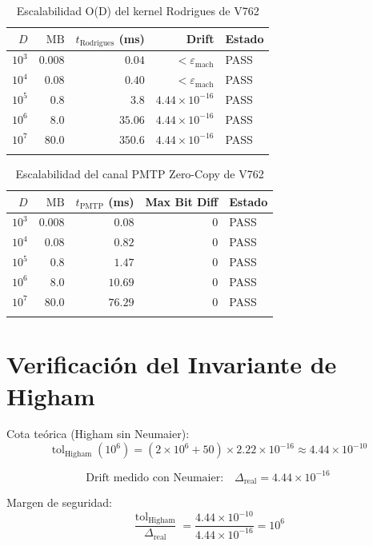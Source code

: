 \begin{longtable}{rrrrl}
\toprule
$D$ & $\text{MB}$ & $t_{\text{Rodrigues}}$ (ms) & Drift & Estado \\
\midrule
$10^3$ & $0.008$ & $0.04$ & $< \varepsilon_{\text{mach}}$ & PASS \\
$10^4$ & $0.08$ & $0.40$ & $< \varepsilon_{\text{mach}}$ & PASS \\
$10^5$ & $0.8$ & $3.8$ & $4.44 \times 10^{-16}$ & PASS \\
$10^6$ & $8.0$ & $35.06$ & $4.44 \times 10^{-16}$ & PASS \\
$10^7$ & $80.0$ & $350.6$ & $4.44 \times 10^{-16}$ & PASS \\
\bottomrule
\caption{Escalabilidad O(D) del kernel Rodrigues de V762}
\label{tab:escalabilidad}
\end{longtable}

\begin{longtable}{rrrrl}
\toprule
$D$ & $\text{MB}$ & $t_{\text{PMTP}}$ (ms) & Max Bit Diff & Estado \\
\midrule
$10^3$ & $0.008$ & $0.08$ & $0$ & PASS \\
$10^4$ & $0.08$ & $0.82$ & $0$ & PASS \\
$10^5$ & $0.8$ & $1.47$ & $0$ & PASS \\
$10^6$ & $8.0$ & $10.69$ & $0$ & PASS \\
$10^7$ & $80.0$ & $76.29$ & $0$ & PASS \\
\bottomrule
\caption{Escalabilidad del canal PMTP Zero-Copy de V762}
\label{tab:pmtp_escalabilidad}
\end{longtable}

\section{Verificación del Invariante de Higham}

Cota teórica (Higham sin Neumaier):
\begin{equation}
\operatorname{tol}_{\text{Higham}}(10^6) = (2 \times 10^6 + 50) \times 2.22 \times 10^{-16} \approx 4.44 \times 10^{-10}
\end{equation}

\begin{equation}
\text{Drift medido con Neumaier:} \quad \Delta_{\text{real}} = 4.44 \times 10^{-16}
\end{equation}

Margen de seguridad:
\begin{equation}
\frac{\operatorname{tol}_{\text{Higham}}}{\Delta_{\text{real}}} = \frac{4.44 \times 10^{-10}}{4.44 \times 10^{-16}} = 10^6
\end{equation}

